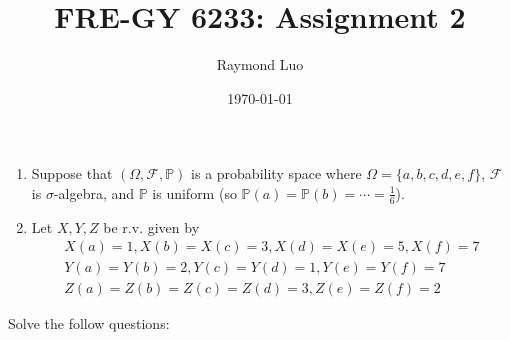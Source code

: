 \documentclass[12pt,twoside, letter]{exam}
\theoremstyle{definition}
\newcommand{\pp}{\mathbb{P}}
\begin{document}
\abovedisplayskip=12pt
\belowdisplayskip=12pt
\abovedisplayshortskip=7pt
\belowdisplayshortskip=10pt
\allowdisplaybreaks

\setlength{\parindent}{18pt}

\title{FRE-GY 6233: Assignment 2}
\author{Raymond Luo}
\date{\today}
\maketitle

\begin{enumerate}[label = (\roman*)]
    \item Suppose that $(\Omega, \mathcal{F}, \pp)$ is a probability space where $\Omega = \{a, b, c, d, e, f\}$, $\mathcal{F}$ is $\sigma$-algebra,
      and $\pp$ is uniform (so $\pp(a) = \pp(b) = \cdots = \frac{1}{6}$).
    \item Let $X, Y, Z$ be r.v. given by
      \begin{multline}
        X(a) = 1, X(b) = X(c) = 3, X(d) = X(e) = 5, X(f) = 7 \\
        Y(a) = Y(b) = 2, Y(c) = Y(d) = 1, Y(e) = Y(f) = 7 \\
        Z(a) = Z(b) = Z(c) = Z(d) = 3, Z(e) = Z(f) = 2
      \end{multline}
\end{enumerate}
Solve the follow questions:
\end{document}
